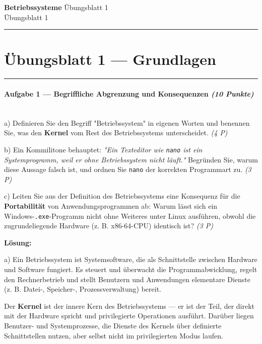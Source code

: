 \documentclass[11pt, a4paper]{article}
\providecommand{\nichttitle}{Übungsblatt}
\providecommand{\nichtsubtitle}{}
\renewcommand{\nichttitle}{Betriebssysteme}
\renewcommand{\nichtsubtitle}{Übungsblatt 1}
\begin{document}
\begin{center}
{\Large\bfseries\color{accent}\nichttitle}
\ifx\nichtsubtitle\empty\else
  \\[2pt]{\normalsize\color{accent!80!black}\nichtsubtitle}
\fi
\\[2pt]
\color{accent}\rule{0.4\linewidth}{0.8pt}\color{black}
\end{center}
\vspace{4pt}


\section{Übungsblatt 1 — Grundlagen}


\noindent\textcolor{rulegray}{\rule{\linewidth}{0.4pt}}


\paragraph{Aufgabe 1 — Begriffliche Abgrenzung und Konsequenzen \textit{(10 Punkte)}}\mbox{}\\[2pt]

a) Definieren Sie den Begriff "Betriebssystem" in eigenen Worten und benennen Sie, was den \textbf{Kernel} vom Rest des Betriebssystems unterscheidet. \textit{(4 P)}


b) Ein Kommilitone behauptet: \textit{"Ein Texteditor wie \texttt{nano} ist ein Systemprogramm, weil er ohne Betriebssystem nicht läuft."} Begründen Sie, warum diese Aussage falsch ist, und ordnen Sie \texttt{nano} der korrekten Programmart zu. \textit{(3 P)}


c) Leiten Sie aus der Definition des Betriebssystems eine Konsequenz für die \textbf{Portabilität} von Anwendungsprogrammen ab: Warum lässt sich ein Windows-\texttt{.exe}-Programm nicht ohne Weiteres unter Linux ausführen, obwohl die zugrundeliegende Hardware (z. B. x86-64-CPU) identisch ist? \textit{(3 P)}


\textbf{Lösung:}


a) Ein Betriebssystem ist Systemsoftware, die als Schnittstelle zwischen Hardware und Software fungiert. Es steuert und überwacht die Programmabwicklung, regelt den Rechnerbetrieb und stellt Benutzern und Anwendungen elementare Dienste (z. B. Datei-, Speicher-, Prozessverwaltung) bereit.

Der \textbf{Kernel} ist der innere Kern des Betriebssystems — er ist der Teil, der direkt mit der Hardware spricht und privilegierte Operationen ausführt. Darüber liegen Benutzer- und Systemprozesse, die Dienste des Kernels über definierte Schnittstellen nutzen, aber selbst nicht im privilegierten Modus laufen.
\end{document}
